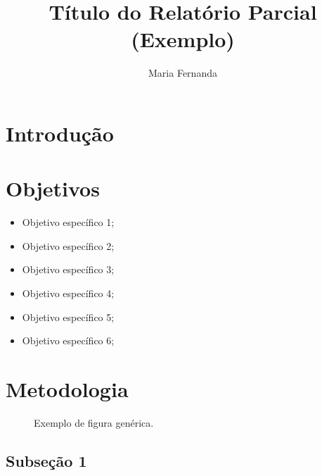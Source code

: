 \documentclass[12pt,report]{uftpibic}
\title{Título do Relatório Parcial (Exemplo)}
\author{Maria Fernanda}{Souza}
\begin{document}
\maketitle
\setlength{\parindent}{1.5cm}

\chapter{Introdução}

\lipsum[1-2]

\chapter{Objetivos}

\lipsum[3]

\begin{itemize}
\item Objetivo específico 1;
\item Objetivo específico 2;
\item Objetivo específico 3;
\item Objetivo específico 4;
\item Objetivo específico 5;
\item Objetivo específico 6;
\end{itemize}

\lipsum[4]

\chapter{Metodologia}

\lipsum[5]

\begin{figure}[!htpb]
    \centering
    \caption{Exemplo de figura genérica.}
    \label{fig:projeto}
\end{figure}

\lipsum[6-8]

\section{Subseção 1}
\end{document}

